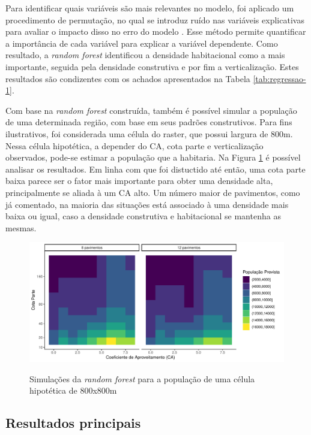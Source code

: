 Para identificar quais variáveis são mais relevantes no modelo, foi aplicado um procedimento de permutação, no qual se introduz ruído nas variáveis explicativas para avaliar o impacto disso no erro do modelo \cite{breiman2001random, Nembrini2018}. Esse método permite quantificar a importância de cada variável para explicar a variável dependente. Como resultado, a \textit{random forest} identificou a densidade habitacional como a mais importante, seguida pela densidade construtiva e por fim a verticalização. Estes resultados são condizentes com os achados apresentados na Tabela \ref{tab:regressao-1}.

Com base na \textit{random forest} construída, também é possível simular a população de uma determinada região, com base em seus padrões construtivos. Para fins ilustrativos, foi considerada uma célula do raster, que possui largura de 800m. Nessa célula hipotética, a depender do CA, cota parte e verticalização observados, pode-se estimar a população que a habitaria. Na Figura \ref{fig:previsoes} é possível analisar os resultados. Em linha com que foi distuctido até então, uma cota parte baixa parece ser o fator mais importante para obter uma densidade alta, principalmente se aliada à um CA alto. Um número maior de pavimentos, como já comentado, na maioria das situações está associado à uma densidade mais baixa ou igual, caso a densidade construtiva e habitacional se mantenha as mesmas.

\begin{figure}[h]
    \centering
    \caption{Simulações da \textit{random forest} para a população de uma célula hipotética de 800x800m}
    \includegraphics[width = \textwidth]{figuras/previsoes.pdf}
    \label{fig:previsoes}
\end{figure}

\subsection{Resultados principais}

